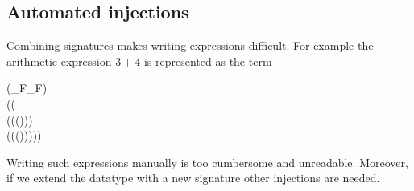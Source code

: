 \subsection{Automated injections}

Combining signatures makes writing expressions difficult. For example
the arithmetic expression \ensuremath{\mathrm{3}\mathbin{+}\mathrm{4}} is represented as the term
\begin{hscode}\SaveRestoreHook
{}%
%
%
%
%
\>[3]{}\mathbin{::}\;(_F\oplus{}_F){}\<[E]%
\\
\>[3]{}\mathrel{=}\;(\;{}\<[22]%
\>[22]{}(\;{}\<[E]%
\\
\>[22]{}\<[25]%
\>[25]{}(\;(\;(\;)))\;{}\<[E]%
\\
\>[22]{}\<[25]%
\>[25]{}(\;(\;(\;))))){}\<[E]%
\ColumnHook
\end{hscode}\resethooks
Writing such expressions manually is too cumbersome and
unreadable. Moreover, if we extend the datatype with a new signature
other injections are needed.

